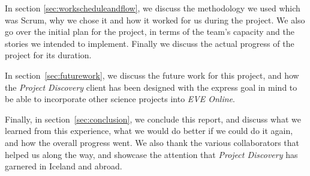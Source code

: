 In section \ref{sec:workscheduleandflow}, we discuss the methodology we used which was Scrum, why we chose it and how it worked for us during the project. We also go over the initial plan for the project, in terms of the team's capacity and the stories we intended to implement. Finally we discuss the actual progress of the project for its duration.

In section~\ref{sec:futurework}, we discuss the future work for this project, and how the \emph{Project Discovery} client has been designed with the express goal in mind to be able to incorporate other science projects into \emph{EVE Online}.

Finally, in section~\ref{sec:conclusion}, we conclude this report, and discuss what we learned from this experience, what we would do better if we could do it again, and how the overall progress went. We also thank the various collaborators that helped us along the way, and showcase the attention that \emph{Project Discovery} has garnered in Iceland and abroad.